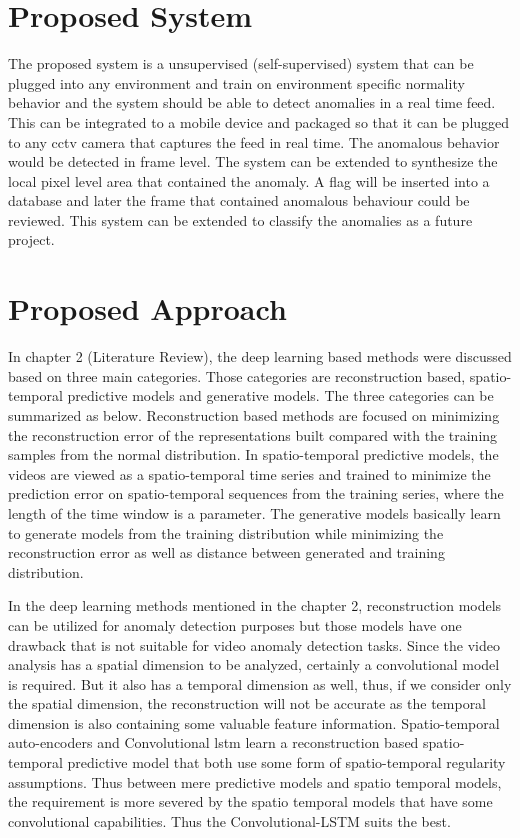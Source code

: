 \documentclass[a4paper,12pt]{report}
\begin{document}
\begin{itemize}
\section{Proposed System}

The proposed system is a unsupervised (self-supervised) system that can be plugged into any environment and train on environment specific normality behavior and the system should be able to detect anomalies in a real time feed. This can be integrated to a mobile device and packaged so that it can be plugged to any cctv camera that captures the feed in real time. The anomalous behavior would be detected in frame level. The system can be extended to synthesize the local pixel level area that contained the anomaly. A flag will be inserted into a database and later the frame that contained anomalous behaviour could be reviewed. This system can be extended to classify the anomalies as a future project.





\section{Proposed Approach}

In chapter 2 (Literature Review), the deep learning based methods were discussed based on three main categories. Those categories are reconstruction based, spatio-temporal predictive models and generative models. The three categories can be summarized as below. Reconstruction based methods are focused on minimizing the reconstruction error of the representations built compared with the training samples from the normal distribution. In spatio-temporal predictive models, the videos are viewed as a spatio-temporal time series and  trained to minimize the prediction error on spatio-temporal sequences from the training series, where the length of the time window is a parameter. The generative models basically learn to generate models from the training distribution while minimizing the reconstruction error as well as distance between generated and training distribution. 

In the deep learning methods mentioned in the chapter 2, reconstruction models can be utilized for anomaly detection purposes but those models have one drawback that is not suitable for video anomaly detection tasks. Since the video analysis has a spatial dimension to be analyzed, certainly a convolutional model is required. But it also has a temporal dimension as well, thus, if we consider only the spatial dimension, the reconstruction will not be accurate as the temporal dimension is also containing some valuable feature information. Spatio-temporal auto-encoders and Convolutional \gls{lstm} learn a reconstruction based spatio-temporal predictive model that both use some form of  spatio-temporal regularity assumptions. Thus between mere predictive models and spatio temporal models, the requirement is more severed by the spatio temporal models that have some convolutional capabilities. Thus the Convolutional-LSTM suits the best.


\end{itemize}
\end{document}
